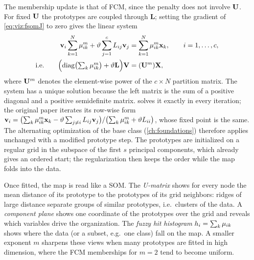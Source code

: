 The membership update is that of FCM, since the penalty does not involve $\mathbf{U}$. For fixed $\mathbf{U}$ the prototypes are coupled through $\mathbf{L}$; setting the gradient of \eqref{eq:viz:fsomJ} to zero gives the linear system
\begin{align}
  \mathbf{v}_i\sum_{k=1}^{N}\mu_{ik}^m + \vartheta\sum_{j=1}^{c}L_{ij}\mathbf{v}_j &= \sum_{k=1}^{N}\mu_{ik}^m\mathbf{x}_k,\qquad i=1,\dots,c,\notag\\
  \text{i.e.}\qquad \Bigl(\operatorname{diag}\bigl(\textstyle\sum_k\mu_{ik}^m\bigr)+\vartheta\mathbf{L}\Bigr)\mathbf{V} &= (\mathbf{U}^m)\mathbf{X},
  \label{eq:viz:fsomV}
\end{align}
where $\mathbf{U}^m$ denotes the element-wise power of the $c\times N$ partition matrix. The system has a unique solution because the left matrix is the sum of a positive diagonal and a positive semidefinite matrix.  solves it exactly in every iteration; the original paper iterates its row-wise form $\mathbf{v}_i=\bigl(\sum_k\mu_{ik}^m\mathbf{x}_k-\vartheta\sum_{j\ne i}L_{ij}\mathbf{v}_j\bigr)/\bigl(\sum_k\mu_{ik}^m+\vartheta L_{ii}\bigr)$, whose fixed point is the same. The alternating optimization of the base class (\cref{ch:foundations}) therefore applies unchanged with a modified prototype step. The prototypes are initialized on a regular grid in the subspace of the first $s$ principal components, which already gives an ordered start; the regularization then keeps the order while the map folds into the data.

Once fitted, the map is read like a SOM. The \emph{U-matrix} shows for every node the mean distance of its prototype to the prototypes of its grid neighbors: ridges of large distance separate groups of similar prototypes, i.e.\ clusters of the data. A \emph{component plane} shows one coordinate of the prototypes over the grid and reveals which variables drive the organization. The \emph{fuzzy hit histogram} $h_i=\sum_k\mu_{ik}$ shows where the data (or a subset, e.g.\ one class) fall on the map. A smaller exponent $m$ sharpens these views when many prototypes are fitted in high dimension, where the FCM memberships for $m=2$ tend to become uniform.

